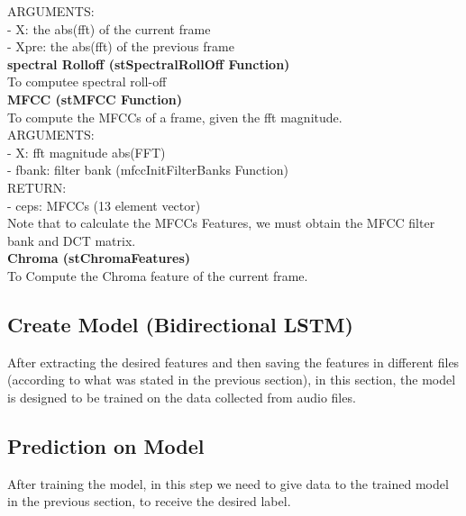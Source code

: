 \documentclass[10pt]{article}
\begin{document}
ARGUMENTS:\\
- X:        the abs(fft) of the current frame\\
- Xpre:        the abs(fft) of the previous frame\\
\textbf{spectral Rolloff (stSpectralRollOff Function)}\\
To computee spectral roll-off\\
\textbf{MFCC (stMFCC Function)}\\
To compute the MFCCs of a frame, given the fft magnitude.\\
ARGUMENTS:\\
- X:        fft magnitude abs(FFT)\\
- fbank:    filter bank (mfccInitFilterBanks Function)\\
RETURN:\\
- ceps: MFCCs (13 element vector)\\
Note that to calculate the MFCCs Features, we must obtain the MFCC filter bank and DCT matrix.\\
\textbf{Chroma (stChromaFeatures)}\\
To Compute the Chroma feature of the current frame.\\
\subsection{\textbf{\normalsize Create Model (Bidirectional LSTM) }}
After extracting the desired features and then saving the features in different files (according to what was stated in the previous section), in this section, the model is designed to be trained on the data collected from audio files.\\
\subsection{\textbf{\normalsize Prediction on Model }}
After training the model, in this step we need to give data to the trained model in the previous section, to receive the desired label.
\end{document}
